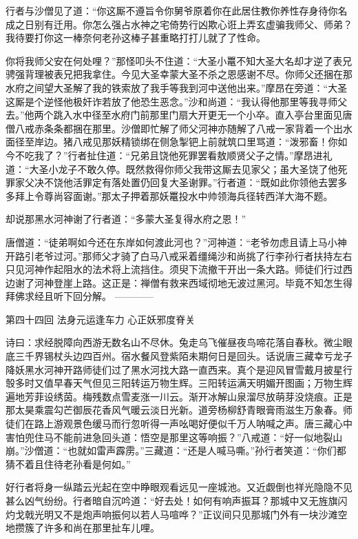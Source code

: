 \documentclass[12pt,UTF8]{ctexbook}
\begin{document}
行者与沙僧见了道：“你这厮不遵旨令你舅爷原着你在此居住教你养性存身待你名成之日别有迁用。你怎么强占水神之宅倚势行凶欺心诳上弄玄虚骗我师父、师弟？我待要打你这一棒奈何老孙这棒子甚重略打打儿就了了性命。

你将我师父安在何处哩？”那怪叩头不住道：“大圣小鼍不知大圣大名却才逆了表兄骋强背理被表兄把我拿住。今见大圣幸蒙大圣不杀之恩感谢不尽。你师父还捆在那水府之间望大圣解了我的铁索放了我手等我到河中送他出来。”摩昂在旁道：“大圣这厮是个逆怪他极奸诈若放了他恐生恶念。”沙和尚道：“我认得他那里等我寻师父去。”他两个跳入水中径至水府门前那里门扇大开更无一个小卒。直入亭台里面见唐僧八戒赤条条都捆在那里。沙僧即忙解了师父河神亦随解了八戒一家背着一个出水面径至岸边。猪八戒见那妖精锁绑在侧急掣钯上前就筑口里骂道：“泼邪畜！你如今不吃我了？”行者扯住道：“兄弟且饶他死罪罢看敖顺贤父子之情。”摩昂进礼道：“大圣小龙子不敢久停。既然救得你师父我带这厮去见家父；虽大圣饶了他死罪家父决不饶他活罪定有落处置仍回复大圣谢罪。”行者道：“既如此你领他去罢多多拜上令尊尚容面谢。”那太子押着那妖鼍投水中帅领海兵径转西洋大海不题。

却说那黑水河神谢了行者道：“多蒙大圣复得水府之恩！”

唐僧道：“徒弟啊如今还在东岸如何渡此河也？”河神道：“老爷勿虑且请上马小神开路引老爷过河。”那师父才骑了白马八戒采着缰绳沙和尚挑了行李孙行者扶持左右只见河神作起阻水的法术将上流挡住。须臾下流撤干开出一条大路。师徒们行过西边谢了河神登崖上路。这正是：禅僧有救来西域彻地无波过黑河。毕竟不知怎生得拜佛求经且听下回分解。
------------

第四十四回 法身元运逢车力 心正妖邪度脊关

诗曰：求经脱障向西游无数名山不尽休。兔走乌飞催昼夜鸟啼花落自春秋。微尘眼底三千界锡杖头边四百州。宿水餐风登紫陌未期何日是回头。话说唐三藏幸亏龙子降妖黑水河神开路师徒们过了黑水河找大路一直西来。真个是迎风冒雪戴月披星行彀多时又值早春天气但见三阳转运万物生辉。三阳转运满天明媚开图画；万物生辉遍地芳菲设绣茵。梅残数点雪麦涨一川云。渐开冰解山泉溜尽放萌芽没烧痕。正是那太昊乘震勾芒御辰花香风气暖云淡日光新。道旁杨柳舒青眼膏雨滋生万象春。师徒们在路上游观景色缓马而行忽听得一声吆喝好便似千万人呐喊之声。唐三藏心中害怕兜住马不能前进急回头道：悟空是那里这等响振？”八戒道：“好一似地裂山崩。”沙僧道：“也就如雷声霹雳。”三藏道：“还是人喊马嘶。”孙行者笑道：“你们都猜不着且住待老孙看是何如。”

好行者将身一纵踏云光起在空中睁眼观看远见一座城池。又近觑倒也祥光隐隐不见甚么凶气纷纷。行者暗自沉吟道：“好去处！如何有响声振耳？那城中又无旌旗闪灼戈戟光明又不是炮声响振何以若人马喧哗？”正议间只见那城门外有一块沙滩空地攒簇了许多和尚在那里扯车儿哩。
\end{document}
